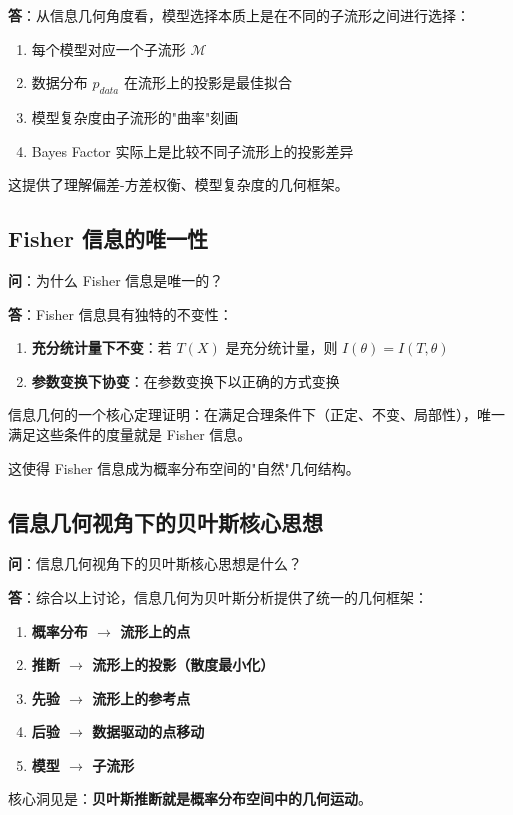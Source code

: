 \textbf{答}：从信息几何角度看，模型选择本质上是在不同的子流形之间进行选择：

\begin{enumerate}
    \item 每个模型对应一个子流形 $\mathcal{M}$
    \item 数据分布 $p_{data}$ 在流形上的投影是最佳拟合
    \item 模型复杂度由子流形的"曲率"刻画
    \item Bayes Factor 实际上是比较不同子流形上的投影差异
\end{enumerate}

这提供了理解偏差-方差权衡、模型复杂度的几何框架。

\subsection{Fisher 信息的唯一性}\label{sec:qa-fisher-information-uniqueness}

\textbf{问}：为什么 Fisher 信息是唯一的？

\textbf{答}：Fisher 信息具有独特的不变性：

\begin{enumerate}
    \item \textbf{充分统计量下不变}：若 $T(X)$ 是充分统计量，则 $I(\theta) = I(T, \theta)$
    \item \textbf{参数变换下协变}：在参数变换下以正确的方式变换
\end{enumerate}

信息几何的一个核心定理证明：在满足合理条件下（正定、不变、局部性），唯一满足这些条件的度量就是 Fisher 信息。

这使得 Fisher 信息成为概率分布空间的"自然"几何结构。

\subsection{信息几何视角下的贝叶斯核心思想}\label{sec:qa-bayesian-core-info-geometry}

\textbf{问}：信息几何视角下的贝叶斯核心思想是什么？

\textbf{答}：综合以上讨论，信息几何为贝叶斯分析提供了统一的几何框架：

\begin{enumerate}
    \item \textbf{概率分布 $\rightarrow$ 流形上的点}
    \item \textbf{推断 $\rightarrow$ 流形上的投影（散度最小化）}
    \item \textbf{先验 $\rightarrow$ 流形上的参考点}
    \item \textbf{后验 $\rightarrow$ 数据驱动的点移动}
    \item \textbf{模型 $\rightarrow$ 子流形}
\end{enumerate}

核心洞见是：\textbf{贝叶斯推断就是概率分布空间中的几何运动}。
